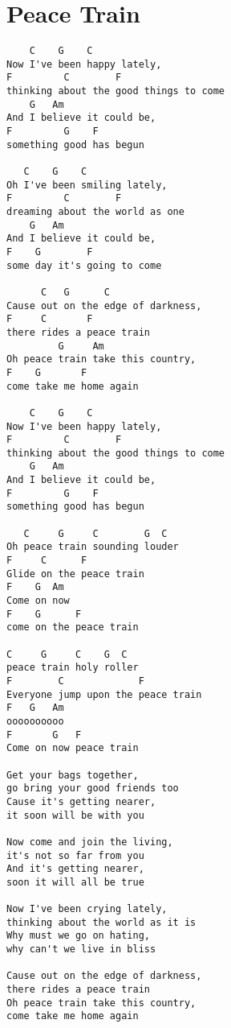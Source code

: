 \documentclass[leqno]{memoir}
\begin{document}
\chapter{Peace Train}
\begin{verbatim}
    C    G    C
Now I've been happy lately, 
F         C        F
thinking about the good things to come
    G   Am 
And I believe it could be, 
F         G    F
something good has begun

   C    G    C
Oh I've been smiling lately, 
F         C        F
dreaming about the world as one
    G   Am
And I believe it could be, 
F    G        F
some day it's going to come

      C   G      C
Cause out on the edge of darkness, 
F     C       F
there rides a peace train
         G     Am
Oh peace train take this country, 
F    G       F
come take me home again

    C    G    C
Now I've been happy lately, 
F         C        F
thinking about the good things to come
    G   Am 
And I believe it could be, 
F         G    F
something good has begun

   C     G     C        G  C
Oh peace train sounding louder
F     C      F
Glide on the peace train
F    G  Am
Come on now 
F    G      F
come on the peace train

C     G     C    G  C  
peace train holy roller
F        C             F
Everyone jump upon the peace train
F   G   Am
oooooooooo
F       G   F
Come on now peace train

Get your bags together, 
go bring your good friends too
Cause it's getting nearer, 
it soon will be with you

Now come and join the living, 
it's not so far from you
And it's getting nearer, 
soon it will all be true

Now I've been crying lately, 
thinking about the world as it is
Why must we go on hating, 
why can't we live in bliss

Cause out on the edge of darkness, 
there rides a peace train
Oh peace train take this country, 
come take me home again

\end{verbatim}
\newpage
\end{document}
